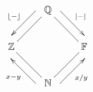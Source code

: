 \documentclass{article}
\begin{document}
\[
\xymatrix{
  & \mathbb{Q} \ar@{-}[dl] \ar@<-2ex>[dl]_{\lfloor - \rfloor} \ar@{-}[dr] \ar@<2ex>[dr]^{|-|}& \\
  \mathbb{Z} \ar@{-}[dr] & & \mathbb{F} \ar@{-}[dl] \\
  & \mathbb{N} \ar@<2ex>[ul]^{x-y} \ar@<-2ex>[ur]_{x/y} &
}
\]
\end{document}
